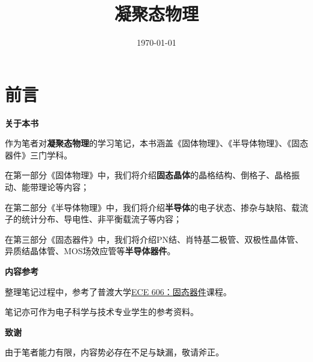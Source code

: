 \documentclass[12pt,oneside,a4paper]{book}
\title{凝聚态物理}
\author{}
\date{\today}
\begin{document}
\maketitle          %

\frontmatter
\chapter{前言}
\textbf{关于本书}

作为笔者对\textbf{凝聚态物理}的学习笔记，本书涵盖《固体物理》、《半导体物理》、《固态器件》三门学科。

在第一部分《固体物理》中，我们将介绍\textbf{固态晶体}的晶格结构、倒格子、晶格振动、能带理论等内容；

在第二部分《半导体物理》中，我们将介绍\textbf{半导体}的电子状态、掺杂与缺陷、载流子的统计分布、导电性、非平衡载流子等内容；

在第三部分《固态器件》中，我们将介绍PN结、肖特基二极管、双极性晶体管、异质结晶体管、MOS场效应管等\textbf{半导体器件}。

\hspace{2em}

\textbf{内容参考}

整理笔记过程中，参考了普渡大学\href{https://nanohub.org/courses/ECE606/2020x/outline}{ECE 606：固态器件}课程。

笔记亦可作为电子科学与技术专业学生的参考资料。

\hspace{2em}

\textbf{致谢}

由于笔者能力有限，内容势必存在不足与缺漏，敬请斧正。

\tableofcontents    %

\mainmatter







\backmatter
\end{document}
